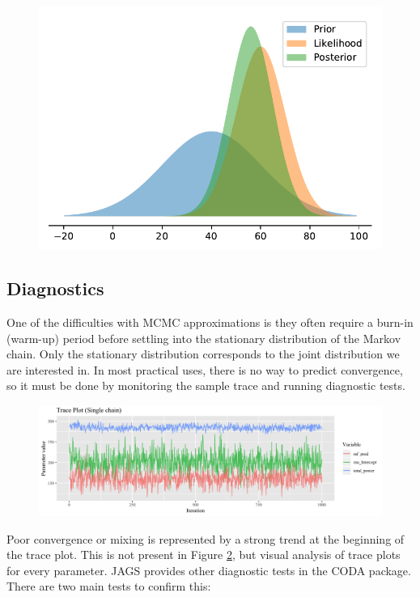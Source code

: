 \documentclass[a4paper, 12pt]{article}
\begin{document}
\begin{figure}
\centering
  \includegraphics[width=0.5\linewidth]{media/bayesdemo}
  \label{fig:bayesdemo}
\end{figure}

\subsection{Diagnostics}
One of the difficulties with MCMC approximations is they often require a burn-in (warm-up) period before settling into the stationary distribution of the Markov chain. Only the stationary distribution corresponds to the joint distribution we are interested in. In most practical uses, there is no way to predict convergence, so it must be done by monitoring the sample trace and running diagnostic tests.

\begin{figure}
\centering
  \includegraphics[width=\linewidth]{media/trace_plot}
  \label{fig:trace_plot}
\end{figure}

Poor convergence or mixing is represented by a strong trend at the beginning of the trace plot. This is not present in Figure \ref{fig:trace_plot}, but visual analysis of trace plots for every parameter.
JAGS provides other diagnostic tests in the CODA package. There are two main tests to confirm this:
\end{document}

